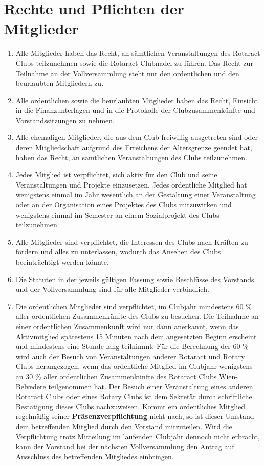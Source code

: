 \documentclass{statutclass}
\begin{document}
\section{Rechte und Pflichten der Mitglieder}\label{rechteundpflichten}
\begin{enumerate}
    \item Alle Mitglieder haben das Recht, an sämtlichen Veranstaltungen des Rotaract Clubs teilzunehmen sowie die Rotaract Clubnadel zu führen. Das Recht zur Teilnahme an der Vollversammlung steht nur den ordentlichen und den beurlaubten Mitgliedern zu.
    \item Alle ordentlichen sowie die beurlaubten Mitglieder haben das Recht, Einsicht in die Finanzunterlagen und in die Protokolle der Clubzusammenkünfte und Vorstandssitzungen zu nehmen.
    \item Alle ehemaligen Mitglieder, die aus dem Club freiwillig ausgetreten sind oder deren Mitgliedschaft aufgrund des Erreichens der Altersgrenze geendet hat, haben das Recht, an sämtlichen Veranstaltungen des Clubs teilzunehmen.
    \item Jedes Mitglied ist verpflichtet, sich aktiv für den Club und seine Veranstaltungen und Projekte einzusetzen. Jedes ordentliche Mitglied hat wenigstens einmal im Jahr wesentlich an der Gestaltung einer Veranstaltung oder an der Organisation eines Projektes des Clubs mitzuwirken und wenigstens einmal im Semester an einem Sozialprojekt des Clubs teilzunehmen.
    \item Alle Mitglieder sind verpflichtet, die Interessen des Clubs nach Kräften zu fördern und alles zu unterlassen, wodurch das Ansehen des Clubs beeinträchtigt werden könnte.
    \item Die Statuten in der jeweils gültigen Fassung sowie Beschlüsse des Vorstands und der Vollversammlung sind für alle Mitglieder verbindlich.
    \item Die ordentlichen Mitglieder sind verpflichtet, im Clubjahr mindestens 60 \% aller ordentlichen Zusammenkünfte des Clubs zu besuchen. Die Teilnahme an einer ordentlichen Zusammenkunft wird nur dann anerkannt, wenn das Aktivmitglied spätestens 15 Minuten nach dem angesetzten Beginn erscheint und mindestens eine Stunde lang teilnimmt. Für die Berechnung der 60 \% wird auch der Besuch von Veranstaltungen anderer Rotaract und Rotary Clubs herangezogen, wenn das ordentliche Mitglied im Clubjahr wenigstens an 30 \% aller ordentlichen Zusammenkünfte des Rotaract Clubs Wien-Belvedere teilgenommen hat. Der Besuch einer Veranstaltung eines anderen Rotaract Clubs oder eines Rotary Clubs ist dem Sekretär durch schriftliche Bestätigung dieses Clubs nachzuweisen. Kommt ein ordentliches Mitglied regelmäßig seiner \textbf{Präsenzverpflichtung} nicht nach, so ist dieser Umstand dem betreffenden Mitglied durch den Vorstand mitzuteilen. Wird die Verpflichtung trotz Mitteilung im laufenden Clubjahr dennoch nicht erbracht, kann der Vorstand bei der nächsten Vollversammlung den Antrag auf Ausschluss des betreffenden Mitgliedes einbringen.

\end{enumerate}
\end{document}
